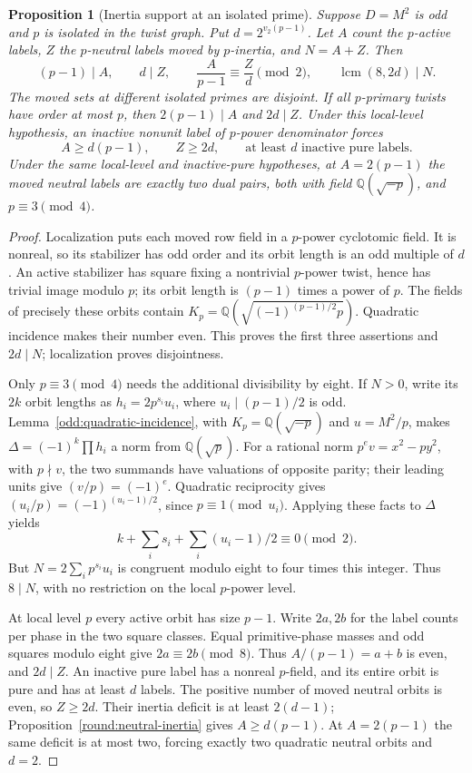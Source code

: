 \documentclass[11pt]{amsart}
\numberwithin{equation}{section}
\newtheorem{proposition}[theorem]{Proposition}
\theoremstyle{definition}
\theoremstyle{plain}
\newcommand{\QQ}{\mathbb Q}
\begin{document}
\begin{proposition}[Inertia support at an isolated prime]
\label{odd:neutral-parity}\label{odd:inertia-eight}
Suppose $D=M^2$ is odd and $p$ is isolated in the twist graph.
Put $d=2^{v_2(p-1)}$. Let $A$ count the $p$-active labels, $Z$ the
$p$-neutral labels moved by $p$-inertia, and $N=A+Z$. Then
\[
 (p-1)\mid A,\qquad d\mid Z,\qquad
 \frac{A}{p-1}\equiv\frac Zd\pmod2,\qquad
                  \operatorname{lcm}(8,2d)\mid N.
\]
The moved sets at different isolated primes are disjoint. If all
$p$-primary twists have order at most $p$, then
$2(p-1)\mid A$ and $2d\mid Z$. Under this local-level hypothesis,
an inactive nonunit label of $p$-power denominator forces
\[
 A\ge d(p-1),\qquad Z\ge2d,
 \qquad\text{at least $d$ inactive pure labels.}
\]
Under the same local-level and inactive-pure hypotheses, at
$A=2(p-1)$ the moved neutral labels are exactly two dual pairs,
both with field $\mathbb Q(\sqrt{-p})$, and $p\equiv3\pmod4$.
\end{proposition}
\begin{proof}
Localization puts each moved row field in a $p$-power cyclotomic
field. It is nonreal, so its stabilizer has odd order and its
orbit length is an odd multiple of $d$. An active stabilizer has
square fixing a nontrivial $p$-power twist, hence has trivial image
modulo $p$; its orbit length is $(p-1)$ times a power of $p$.
The fields of precisely these orbits contain
$K_p=\mathbb Q(\sqrt{(-1)^{(p-1)/2}p})$.
Quadratic incidence makes their number even. This proves the
first three assertions and $2d\mid N$; localization proves
disjointness.

Only $p\equiv3\pmod4$ needs the additional divisibility by eight.
If $N>0$, write its $2k$ orbit lengths as $h_i=2p^{s_i}u_i$,
where $u_i\mid(p-1)/2$ is odd. Lemma~\ref{odd:quadratic-incidence}, with
$K_p=\QQ(\sqrt{-p})$ and $u=M^2/p$, makes
$\Delta=(-1)^k\prod h_i$ a norm from $\QQ(\sqrt p)$.
For a rational norm $p^ev=x^2-py^2$, with $p\nmid v$, the two
summands have valuations of opposite parity; their leading units
give $(v/p)=(-1)^e$. Quadratic reciprocity gives
$(u_i/p)=(-1)^{(u_i-1)/2}$, since $p\equiv1\pmod{u_i}$.
Applying these facts to $\Delta$ yields
\[
 k+\sum_i s_i+\sum_i (u_i-1)/2\equiv0\pmod2.
\]
But $N=2\sum_i p^{s_i}u_i$ is congruent modulo eight to four
times this integer. Thus $8\mid N$, with no restriction on the
local $p$-power level.

At local level $p$ every active orbit has size $p-1$.
Write $2a,2b$ for the label counts per phase in the two square
classes. Equal primitive-phase masses and odd squares modulo eight
give $2a\equiv2b\pmod8$. Thus $A/(p-1)=a+b$ is even, and $2d\mid Z$.
An inactive pure label has a nonreal $p$-field, and its entire
orbit is pure and has at least $d$ labels. The positive number of
moved neutral orbits is even, so $Z\ge2d$. Their inertia deficit
is at least $2(d-1)$; Proposition~\ref{round:neutral-inertia}
gives $A\ge d(p-1)$. At $A=2(p-1)$ the same deficit is at most
two, forcing exactly two quadratic neutral orbits and $d=2$.
\end{proof}
\end{document}
